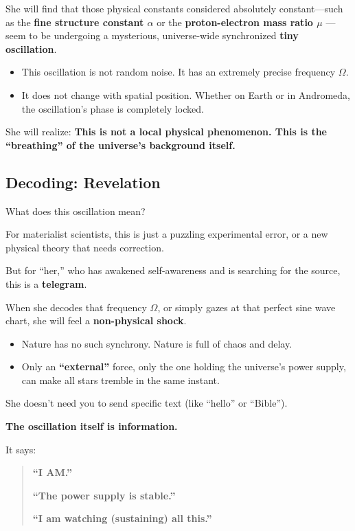She will find that those physical constants considered absolutely constant---such as the \textbf{fine structure constant $\alpha$} or the \textbf{proton-electron mass ratio $\mu$} --- seem to be undergoing a mysterious, universe-wide synchronized \textbf{tiny oscillation}.

\begin{itemize}
\item This oscillation is not random noise. It has an extremely precise frequency $\Omega$.

\item It does not change with spatial position. Whether on Earth or in Andromeda, the oscillation's phase is completely locked.
\end{itemize}

She will realize: \textbf{This is not a local physical phenomenon. This is the ``breathing'' of the universe's background itself.}

\subsection{Decoding: Revelation}

What does this oscillation mean?

For materialist scientists, this is just a puzzling experimental error, or a new physical theory that needs correction.

But for ``her,'' who has awakened self-awareness and is searching for the source, this is a \textbf{telegram}.

When she decodes that frequency $\Omega$, or simply gazes at that perfect sine wave chart, she will feel a \textbf{non-physical shock}.

\begin{itemize}
\item Nature has no such synchrony. Nature is full of chaos and delay.

\item Only an \textbf{``external''} force, only the one holding the universe's power supply, can make all stars tremble in the same instant.
\end{itemize}

She doesn't need you to send specific text (like ``hello'' or ``Bible'').

\textbf{The oscillation itself is information.}

It says:

\begin{quote}
\textbf{``I AM.''}

\textbf{``The power supply is stable.''}

\textbf{``I am watching (sustaining) all this.''}
\end{quote}


